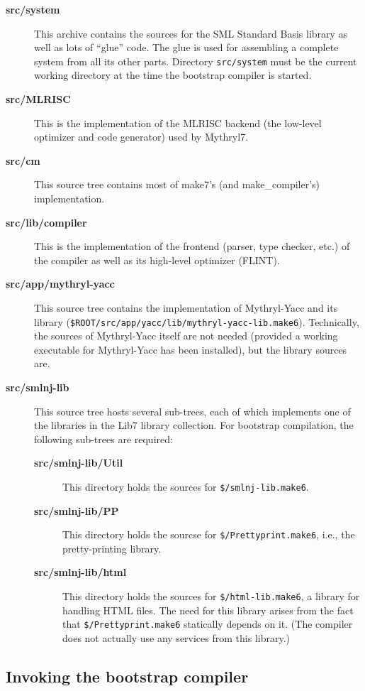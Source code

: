 \begin{description}
\item[{\bf src/system}] This archive contains the sources for the SML
Standard Basis library as well as lots of ``glue'' code.  The glue is
used for assembling a complete system from all its other parts.
Directory {\tt src/system} must be the current working directory at
the time the bootstrap compiler is started.
\item[{\bf src/MLRISC}] This is the implementation of the MLRISC
backend (the low-level optimizer and code generator) used by Mythryl7.
\item[{\bf src/cm}] This source tree contains most of make7's (and make_compiler's)
implementation.
\item[{\bf src/lib/compiler}] This is the implementation of the frontend
(parser, type checker, etc.) of the compiler as well as its high-level
optimizer (FLINT).
\item[{\bf src/app/mythryl-yacc}] This source tree contains the implementation
of Mythryl-Yacc and its library ({\tt \$ROOT/src/app/yacc/lib/mythryl-yacc-lib.make6}).
Technically, the sources of Mythryl-Yacc itself are not needed (provided a
working executable for Mythryl-Yacc has been installed), but the library
sources are.
\item[{\bf src/smlnj-lib}] This source tree hosts several sub-trees,
each of which implements one of the libraries in the Lib7 library
collection.  For bootstrap compilation, the following sub-trees are
required:
\begin{description}
\item[{\bf src/smlnj-lib/Util}] This directory holds the sources for
{\tt \$/smlnj-lib.make6}.
\item[{\bf src/smlnj-lib/PP}] This directory holds the sourcse for
{\tt \$/Prettyprint.make6}, i.e., the pretty-printing library.
\item[{\bf src/smlnj-lib/html}] This directory holds the sources for
{\tt \$/html-lib.make6}, a library for handling HTML files.  The need for
this library arises from the fact that {\tt \$/Prettyprint.make6} statically
depends on it.  (The compiler does not actually use any services from
this library.)
\end{description}
\end{description}

\subsection{Invoking the bootstrap compiler}

